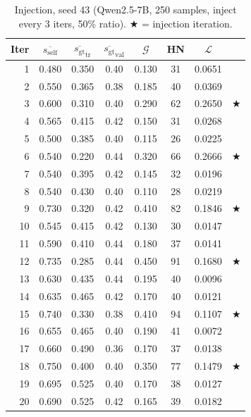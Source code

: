 \documentclass{article}
\newcommand{\gap}{\mathcal{G}}          %
\newcommand{\self}{s_{\text{self}}}     %
\newcommand{\gt}{s_{\text{gt}}}         %
\begin{document}
\begin{table}[h]
\centering
\caption{Injection, seed 43 (Qwen2.5-7B, 250 samples, inject every 3 iters, 50\% ratio).
$\bigstar$ = injection iteration.}
\label{tab:app-injection-seed43}
\small
\begin{tabular}{rccccccl}
\toprule
Iter & $\overline{\self}$ & $\overline{\gt}_\text{tr}$ & $\overline{\gt}_\text{val}$ & $\gap$ & HN & $\mathcal{L}$ & \\
\midrule
1  & 0.480 & 0.350 & 0.40 & 0.130 & 31 & 0.0651 & \\
2  & 0.550 & 0.365 & 0.38 & 0.185 & 40 & 0.0369 & \\
3  & 0.600 & 0.310 & 0.40 & 0.290 & 62 & 0.2650 & $\bigstar$ \\
4  & 0.565 & 0.415 & 0.42 & 0.150 & 31 & 0.0268 & \\
5  & 0.500 & 0.385 & 0.40 & 0.115 & 26 & 0.0225 & \\
6  & 0.540 & 0.220 & 0.44 & 0.320 & 66 & 0.2666 & $\bigstar$ \\
7  & 0.540 & 0.395 & 0.42 & 0.145 & 32 & 0.0196 & \\
8  & 0.540 & 0.430 & 0.40 & 0.110 & 28 & 0.0219 & \\
9  & 0.730 & 0.320 & 0.42 & 0.410 & 82 & 0.1846 & $\bigstar$ \\
10 & 0.545 & 0.415 & 0.42 & 0.130 & 30 & 0.0147 & \\
11 & 0.590 & 0.410 & 0.44 & 0.180 & 37 & 0.0141 & \\
12 & 0.735 & 0.285 & 0.44 & 0.450 & 91 & 0.1680 & $\bigstar$ \\
13 & 0.630 & 0.435 & 0.44 & 0.195 & 40 & 0.0096 & \\
14 & 0.635 & 0.465 & 0.42 & 0.170 & 40 & 0.0121 & \\
15 & 0.740 & 0.330 & 0.38 & 0.410 & 94 & 0.1107 & $\bigstar$ \\
16 & 0.655 & 0.465 & 0.40 & 0.190 & 41 & 0.0072 & \\
17 & 0.660 & 0.490 & 0.36 & 0.170 & 37 & 0.0138 & \\
18 & 0.750 & 0.400 & 0.40 & 0.350 & 77 & 0.1479 & $\bigstar$ \\
19 & 0.695 & 0.525 & 0.40 & 0.170 & 38 & 0.0127 & \\
20 & 0.690 & 0.525 & 0.42 & 0.165 & 39 & 0.0182 & \\
\bottomrule
\end{tabular}
\end{table}
\end{document}
